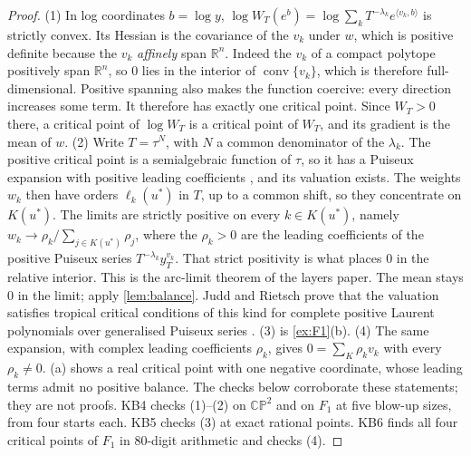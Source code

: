 \documentclass[11pt]{article}
\theoremstyle{definition}\newtheorem{definition}[theorem]{Definition}\newtheorem{remark}[theorem]{Remark}\newtheorem{example}[theorem]{Example}\newtheorem{problem}[theorem]{Open problem}\crefname{problem}{Problem}{Problems}
\newcommand{\R}{\mathbb R}
\begin{document}
\begin{proof}
(1) In log coordinates $b=\log y$, $\log W_T(e^b)=\log\sum_kT^{-\lambda_k}e^{\langle v_k,b\rangle}$ is strictly convex. Its Hessian is the covariance of the $v_k$ under $w$, which is positive definite because the
$v_k$ \emph{affinely} span $\R^n$. Indeed the $v_k$ of a compact polytope positively span $\R^n$, so $0$ lies in the interior of $\operatorname{conv}\{v_k\}$, which is therefore full-dimensional.
Positive spanning also makes the function coercive: every direction increases some term. It therefore has exactly one critical point. Since $W_T>0$
there, a critical point of $\log W_T$ is a critical point of $W_T$, and its gradient is the mean of $w$. (2) Write $T=\tau^N$, with $N$ a common
denominator of the $\lambda_k$. The positive critical point is a semialgebraic function of $\tau$, so it has a Puiseux expansion with positive leading
coefficients \cite{BochnakCosteRoy1998}, and its valuation exists. The weights $w_k$ then have orders $\ell_k(u^*)$ in $T$, up to a common shift, so they
concentrate on $K(u^*)$. The limits are strictly positive on every $k\in K(u^*)$, namely $w_k\to\rho_k/\sum_{j\in K(u^*)}\rho_j$, where the $\rho_k>0$ are the leading
coefficients of the positive Puiseux series $T^{-\lambda_k}y_T^{v_k}$. That strict positivity is what places $0$ in the relative interior. This is the arc-limit theorem of the layers paper. The mean stays $0$ in the limit; apply
\cref{lem:balance}. Judd and Rietsch prove that the valuation satisfies tropical critical conditions of this kind for complete positive Laurent
polynomials over generalised Puiseux series \cite{JuddRietsch2019}. (3) is \cref{ex:F1}(b). (4) The same expansion, with complex leading coefficients $\rho_k$, gives $0=\sum_{K}\rho_kv_k$ with every
$\rho_k\ne0$. (a) shows a real critical point with one negative coordinate, whose leading terms admit no positive balance.
The checks below corroborate these statements; they are not proofs.
KB4 checks (1)--(2) on $\mathbb{CP}^2$ and on $F_1$ at five blow-up sizes, from four starts each. KB5 checks (3) at exact rational points. KB6
finds all four critical points of $F_1$ in $80$-digit arithmetic and checks (4).
\end{proof}
\end{document}
